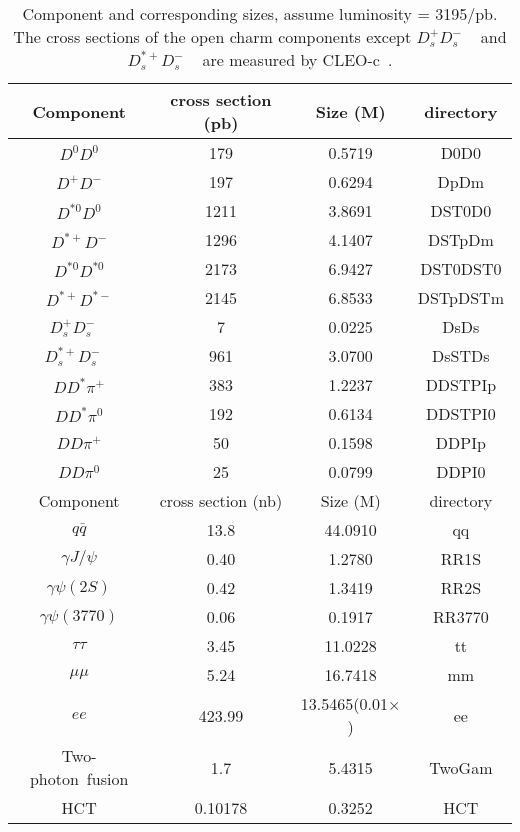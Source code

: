 \begin{table}[htp]
\begin{center}
\caption{Component and corresponding sizes, assume luminosity = 3195/pb.
    The cross sections of the open charm components except  $D_{s}^{+}D_{s}^{-}$ ~\cite{DocDB 580-v1} and $D_{s}^{*+}D_{s}^{-}$ ~\cite{preliminary} are measured by CLEO-c~\cite{PRD80-072001}.
}
\begin{tabular}{c|c|c|c} \hline
Component        & cross section (pb) & Size (M) & directory \\ \hline
$D^{0}D^{0}$     &        179         & 0.5719  &  D0D0 \\
$D^{+}D^{-}$     &        197         & 0.6294  &  DpDm \\
$D^{*0}D^{0}$    &       1211         & 3.8691  &  DST0D0 \\
$D^{*+}D^{-}$    &       1296         & 4.1407  &  DSTpDm \\
$D^{*0}D^{*0}$   &       2173         & 6.9427  &  DST0DST0 \\
$D^{*+}D^{*-}$   &       2145         & 6.8533  &  DSTpDSTm \\
    $D_{s}^{+}D_{s}^{-}$ ~\cite{DocDB 580-v1}&      7         & 0.0225  &  DsDs \\
    $D_{s}^{*+}D_{s}^{-}$ ~\cite{preliminary}&   961         & 3.0700  &  DsSTDs \\
\hline
$DD^{*}\pi^{+}$  &        383         & 1.2237  &  DDSTPIp \\
$DD^{*}\pi^{0}$  &        192         & 0.6134  &  DDSTPI0 \\
$DD\pi^{+}$      &         50         & 0.1598  &  DDPIp \\
$DD\pi^{0}$      &         25         & 0.0799  &  DDPI0 \\
\hline
Component        &  cross section (nb)& Size (M) & directory\\ \hline
$q\bar{q}$       &       13.8         & 44.0910  & qq \\
$\gamma J/\psi$  &        0.40        &  1.2780  & RR1S \\
$\gamma \psi(2S)$&        0.42        &  1.3419  & RR2S \\
$\gamma \psi(3770)$ &     0.06        &  0.1917  & RR3770 \\
$\tau \tau$      &        3.45        & 11.0228  & tt \\
$\mu \mu$        &        5.24        & 16.7418  & mm \\
$ee$             &      423.99        & 13.5465(0.01$\times$)  & ee\\
Two-photon\ fusion  &        1.7         &  5.4315   & TwoGam \\
HCT              &        0.10178     &  0.3252   & HCT \\
\hline
\end{tabular}
\label{tab:genMC}
\end{center}
\end{table}

